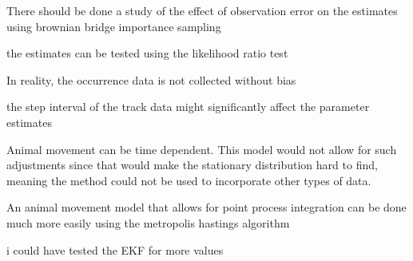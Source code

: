 There should be done a study of the effect of observation error on the estimates using brownian bridge importance sampling

the estimates can be tested using the likelihood ratio test


In reality, the occurrence data is not collected without bias

the step interval of the track data might significantly affect the parameter estimates

Animal movement can be time dependent. This model would not allow for such adjustments since that would make the stationary distribution hard to find, meaning the method could not be used to incorporate other types of data.

An animal movement model that allows for point process integration can be done much more easily using the metropolis hastings algorithm

i could have tested the EKF for more values